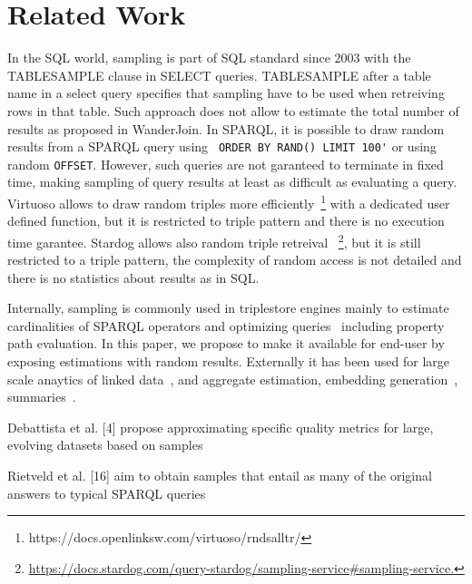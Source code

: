 

\section{Related Work}

In the SQL world, sampling is part of SQL standard since 2003 with the
TABLESAMPLE clause in SELECT
queries. TABLESAMPLE
after a table name in a select query specifies that sampling have to
be used when retreiving rows in that table. Such approach does not
allow to estimate the total number of results as proposed in
WanderJoin\cite{DBLP:journals/tods/LiWYZ19}.  In SPARQL, it is possible to draw random
results from a SPARQL query using \verb+ ORDER BY RAND() LIMIT 100'+
or using random \verb+OFFSET+. However, such queries are not garanteed
to terminate in fixed time, making sampling of query results at least as
difficult as evaluating a query. Virtuoso allows to draw
random triples more
efficiently~\footnote{https://docs.openlinksw.com/virtuoso/rndsalltr/}
with a dedicated user defined function, but it is restricted to triple
pattern and there is no execution time garantee. Stardog allows also
random triple retreival
~\footnote{\url{https://docs.stardog.com/query-stardog/sampling-service#sampling-service.}},
but it is still restricted to a triple pattern, the complexity of
random access is not detailed and there is no statistics about results
as in SQL.

Internally, sampling is commonly used in triplestore engines mainly to
estimate cardinalities of SPARQL operators and optimizing
queries~\cite{DBLP:conf/cidr/LeisRGK017} including property path evaluation\cite{10.1007/978-3-031-33455-9_3}. In this paper, we propose to
make it available for end-user by exposing estimations with random
results. Externally it has been used for large scale anaytics of
linked data~\cite{soulet2019anytime}, and aggregate
estimation\cite{li2016wanderjoin}, embedding
generation~\cite{ristoski2016rdf2vec}, summaries~\cite{10.1007/978-3-030-49461-2_10}.

Debattista et al. [4] propose approximating specific quality metrics
for large, evolving datasets based on
samples~\cite{10.1007/978-3-319-18818-8_14}

Rietveld et al. [16] aim to obtain samples that entail as many of the
original answers to typical SPARQL queries~\cite{10.1007/978-3-319-11915-1_6}



